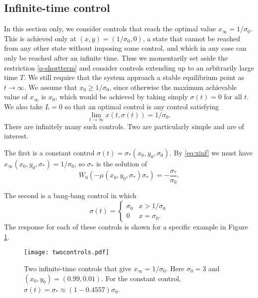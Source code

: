 \documentclass[english,12pt,letter]{article}
\newcommand{\Rnot}{\sigma_0}
\newcommand{\Sinf}{x_\infty}
\begin{document}
\subsection{Infinite-time control}
In this section only, we consider controls that reach the optimal value $\Sinf = 1/\Rnot$.
This is achieved only at $(x,y)=(1/\Rnot,0)$, a state that cannot be reached
from any other state without imposing some control, and which in any case can
only be reached after an infinite time.  Thus we momentarily set aside the restriction
\eqref{q-shortterm} and consider controls extending up to an arbitrarily large time $T$.
We still require that the system approach a stable equilibrium point as $t\to\infty$.
We assume that $x_0\ge1/\Rnot$, since otherwise the maximum achievable value of $\Sinf$
is $x_0$, which would be achieved by taking simply $\sigma(t)=0$ for all $t$.
We also take $L=0$ so that an optimal control is any control satisfying
$$
    \lim_{t \to \infty} x(t,\sigma(t)) = 1/\Rnot.
$$
There are infinitely many such controls.  Two are particularly simple and
are of interest.

The first is a constant control $\sigma(t) = \sigma_*(x_0, y_0, \Rnot)$.
By \eqref{eq:xinf} we must have $\Sinf(x_0,y_0,\sigma_*)=1/\Rnot$, so $\sigma_*$ is the solution of
$$
    W_0(-\mu(x_0,y_0,\sigma_*)\sigma_*) = -\frac{\sigma_*}{\sigma_0}.
$$

The second is a bang-bang control in which
$$
    \sigma(t) = \begin{cases} \Rnot & x>1/\Rnot \\ 0 & x=\Rnot. \end{cases}
$$
The response for each of these controls is shown for a specific example in
Figure \ref{fig:two-controls}.
\begin{figure}
    \centering
    \texttt{[image: twocontrols.pdf]}
    \caption{Two infinite-time controls that give $\Sinf=1/\Rnot$.  Here $\Rnot=3$ and
        $(x_0,y_0)=(0.99,0.01)$.  For the constant control, $\sigma(t)=\sigma_*\approx(1-0.4557)\Rnot$.\label{fig:two-controls}}
\end{figure}
\end{document}
